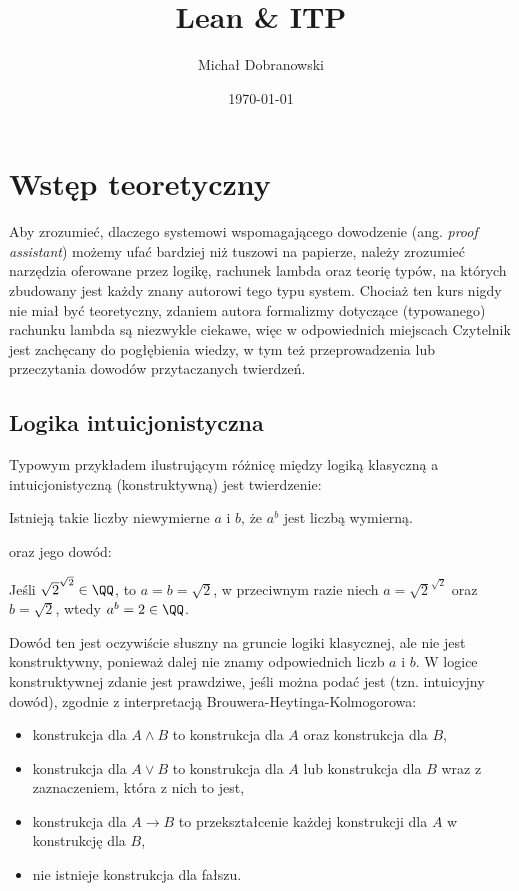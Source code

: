 \documentclass[polish,pretty]{angav}
\title{Lean \& ITP}
\author{Michał Dobranowski}
\date{\today}
\begin{document}
\maketitle
\tableofcontents
\newpage

\section{Wstęp teoretyczny}

Aby zrozumieć, dlaczego systemowi wspomagającego dowodzenie (ang. \textit{proof assistant}) możemy ufać bardziej niż tuszowi na papierze, należy zrozumieć narzędzia oferowane przez logikę, rachunek lambda oraz teorię typów, na których zbudowany jest każdy znany autorowi tego typu system.
Chociaż ten kurs nigdy nie miał być teoretyczny, zdaniem autora formalizmy dotyczące (typowanego) rachunku lambda są niezwykle ciekawe, więc w odpowiednich miejscach Czytelnik jest zachęcany do pogłębienia wiedzy, w tym też przeprowadzenia lub przeczytania dowodów przytaczanych twierdzeń.

\subsection{Logika intuicjonistyczna}

Typowym przykładem ilustrującym różnicę między logiką klasyczną a intuicjonistyczną (konstruktywną) jest twierdzenie:
\begin{displayquote}
    Istnieją takie liczby niewymierne $a$ i $b$, że $a^b$ jest liczbą wymierną.
\end{displayquote}
oraz jego dowód:
\begin{displayquote}
    Jeśli $\sqrt{2}^{\sqrt{2}} \in \QQ$, to $a = b = \sqrt{2}$, w przeciwnym razie niech $a = \sqrt{2}^{\sqrt{2}}$ oraz $b = \sqrt{2}$, wtedy $a^b = 2 \in \QQ$.
\end{displayquote}
Dowód ten jest oczywiście słuszny na gruncie logiki klasycznej, ale nie jest konstruktywny, ponieważ dalej nie znamy odpowiednich liczb $a$ i $b$. W logice konstruktywnej zdanie jest prawdziwe, jeśli można podać jest  (tzn. intuicyjny dowód), zgodnie z interpretacją Brouwera-Heytinga-Kolmogorowa:
\begin{itemize}[noitemsep]
    \item konstrukcja dla $A \land B$ to konstrukcja dla $A$ oraz konstrukcja dla $B$,
    \item konstrukcja dla $A \lor B$ to konstrukcja dla $A$ lub konstrukcja dla $B$ wraz z zaznaczeniem, która z nich to jest,
    \item konstrukcja dla $A \to B$ to przekształcenie każdej konstrukcji dla $A$ w konstrukcję dla $B$,
    \item nie istnieje konstrukcja dla fałszu.
\end{itemize}
\end{document}
